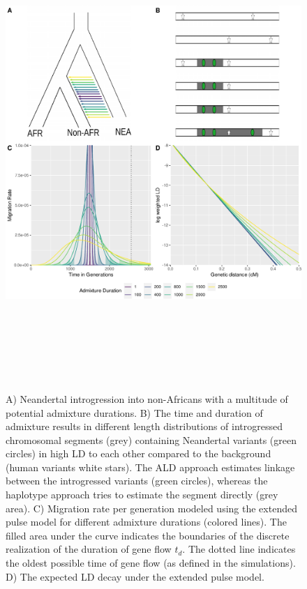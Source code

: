\documentclass[]{article}
\begin{document}
\begin{figure}
\centering
\includegraphics[width=16cm,height=18cm,keepaspectratio]{Admixture_Time_Inference_Paper_Draft_files/figure-latex/fig1-1.pdf}
\caption{\label{fig:fig1} A) Neandertal introgression into non-Africans with a multitude of potential admixture durations. B) The time and duration of admixture results in different length distributions of introgressed chromosomal segments (grey) containing  Neandertal variants (green circles)  in high LD to each other
compared to the background (human variants white stars). The ALD approach estimates linkage
between the introgressed variants (green circles), whereas the haplotype approach tries
to estimate the segment directly (grey area). C) Migration rate per generation
modeled using the extended pulse model for different admixture durations (colored lines). The filled area under the curve indicates the boundaries of the discrete realization of the duration of gene flow $t_d$.
The dotted line indicates the oldest possible time of gene flow (as defined in the simulations). D) The expected LD decay under the extended pulse model.}
\end{figure}
\end{document}
